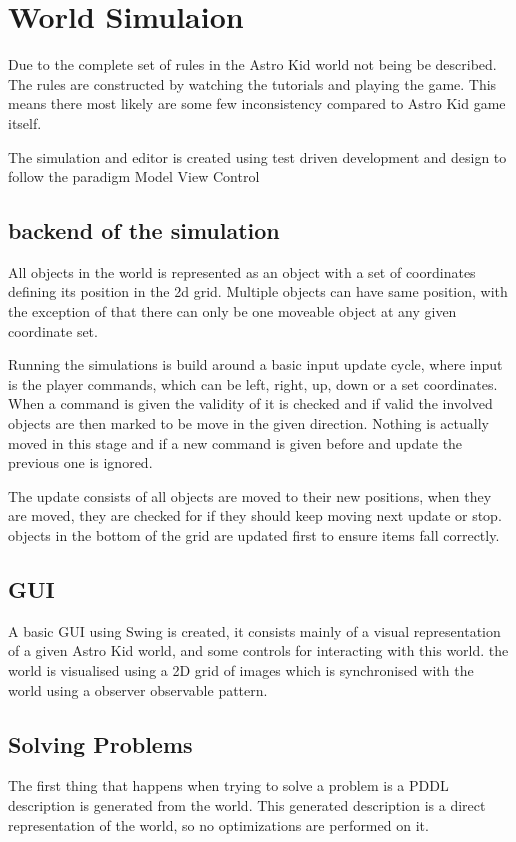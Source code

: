 \section{World Simulaion}
	Due to the complete set of rules in the Astro Kid world not being be described. The rules are constructed by watching the tutorials and playing the game. This means there most likely are some few inconsistency compared to Astro Kid game itself.

	The simulation and editor is created using test driven development and design to follow the paradigm Model View Control 

	\subsection{backend of the simulation}
	All objects in the world is represented as an object with a set of coordinates defining its position in the 2d grid. Multiple objects can have same position, with the exception of that there can only be one moveable object at any given coordinate set.
	
	Running the simulations is build around a basic input update cycle, where input is the player commands, which can be left, right, up, down or a set coordinates. When a command is given the validity of it is checked and if valid the involved objects are then marked to be move in the given direction. Nothing is actually moved in this stage and if a new command is given before and update the previous one is ignored.
	
	The update consists of all objects are moved to their new positions, when they are moved, they are checked for if they should keep moving next update or stop. objects in the bottom of the grid are updated first to ensure items fall correctly.
	
	
	\subsection{GUI}
	A basic GUI using Swing is created, it consists mainly of a visual representation of a given Astro Kid world, and some controls for interacting with this world. the world is visualised using a 2D grid of images which is synchronised with the world using a observer observable pattern.
	
	\subsection{Solving Problems}
	The first thing that happens when trying to solve a problem is a PDDL description is generated from the world. This generated description is a direct representation of the world, so no optimizations are performed on it.

